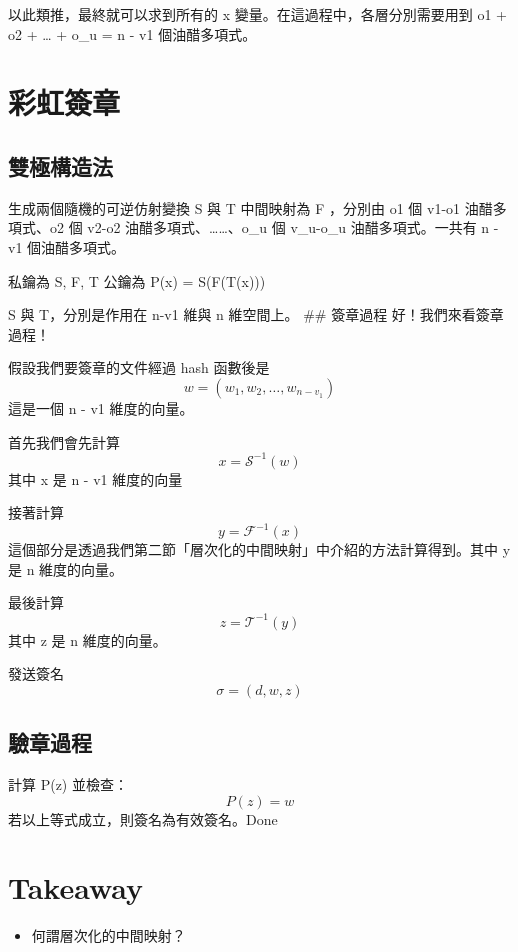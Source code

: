 \documentclass[
]{article}
\providecommand{\tightlist}{%
  \setlength{\itemsep}{0pt}\setlength{\parskip}{0pt}}
\begin{document}
以此類推，最終就可以求到所有的 x 變量。在這過程中，各層分別需要用到 o1 +
o2 + \ldots{} + o\_u = n - v1 個油醋多項式。

\hypertarget{ux5f69ux8679ux7c3dux7ae0}{%
\section{彩虹簽章}\label{ux5f69ux8679ux7c3dux7ae0}}

\hypertarget{ux96d9ux6975ux69cbux9020ux6cd5}{%
\subsection{雙極構造法}\label{ux96d9ux6975ux69cbux9020ux6cd5}}

生成兩個隨機的可逆仿射變換 S 與 T 中間映射為 F ，分別由 o1 個 v1-o1
油醋多項式、o2 個 v2-o2 油醋多項式、\ldots\ldots、o\_u 個 v\_u-o\_u
油醋多項式。一共有 n - v1 個油醋多項式。

私鑰為 S, F, T 公鑰為 P(x) = S(F(T(x)))

S 與 T，分別是作用在 n-v1 維與 n 維空間上。 \#\# 簽章過程
好！我們來看簽章過程！

假設我們要簽章的文件經過 hash 函數後是 \[
w  = (w_{1},w_{2},\dots,w_{n-v_{1}})
\] 這是一個 n - v1 維度的向量。

首先我們會先計算 \[
x = \mathcal{S}^{-1}(w)
\] 其中 x 是 n - v1 維度的向量

接著計算 \[
y = \mathcal{F}^{-1}(x)
\]
這個部分是透過我們第二節「層次化的中間映射」中介紹的方法計算得到。其中 y
是 n 維度的向量。

最後計算 \[
z = \mathcal{T}^{-1}(y)
\] 其中 z 是 n 維度的向量。

發送簽名 \[
\sigma = (d, w, z)
\]

\hypertarget{ux9a57ux7ae0ux904eux7a0b}{%
\subsection{驗章過程}\label{ux9a57ux7ae0ux904eux7a0b}}

計算 P(z) 並檢查： \[
P(z) = w 
\] 若以上等式成立，則簽名為有效簽名。Done

\hypertarget{takeaway}{%
\section{Takeaway}\label{takeaway}}

\begin{itemize}
\tightlist
\item
  何謂層次化的中間映射？
\end{itemize}
\end{document}
